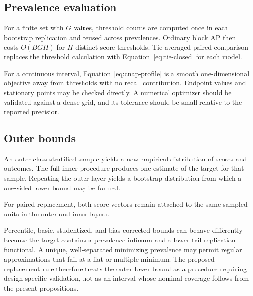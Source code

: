 \documentclass[11pt]{article}
\theoremstyle{remark}
\begin{document}
\subsection{Prevalence evaluation}

For a finite set with $G$ values, threshold counts are computed once in each bootstrap replication and reused across prevalences. Ordinary block AP then costs $O(BGH)$ for $H$ distinct score thresholds. Tie-averaged paired comparison replaces the threshold calculation with Equation~\eqref{eq:tie-closed} for each model.

For a continuous interval, Equation~\eqref{eq:cnap-profile} is a smooth one-dimensional objective away from thresholds with no recall contribution. Endpoint values and stationary points may be checked directly. A numerical optimizer should be validated against a dense grid, and its tolerance should be small relative to the reported precision.

\subsection{Outer bounds}

An outer class-stratified sample yields a new empirical distribution of scores and outcomes. The full inner procedure produces one estimate of the target for that sample. Repeating the outer layer yields a bootstrap distribution from which a one-sided lower bound may be formed.

For paired replacement, both score vectors remain attached to the same sampled units in the outer and inner layers.

Percentile, basic, studentized, and bias-corrected bounds can behave differently because the target contains a prevalence infimum and a lower-tail replication functional. A unique, well-separated minimizing prevalence may permit regular approximations that fail at a flat or multiple minimum. The proposed replacement rule therefore treats the outer lower bound as a procedure requiring design-specific validation, not as an interval whose nominal coverage follows from the present propositions.
\end{document}
